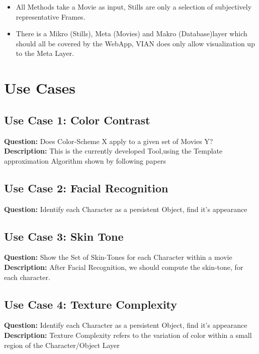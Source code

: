\documentclass[11pt, a4paper,oneside,chapterprefix=false]{scrbook}
\begin{document}
\begin{itemize}
	\item All Methods take a Movie as input, Stills are only a selection of subjectively representative Frames.
	\item There is a Mikro (Stills), Meta (Movies) and Makro (Database)layer which should all be covered by the WebApp, VIAN does only 
	allow visualization up to the Meta Layer.
	
\end{itemize}

\section{Use Cases} \label{chp:introduction}

\subsection{Use Case 1: Color Contrast}
\textbf{Question:} Does Color-Scheme X apply to a given set of Movies Y?\\
\textbf{Description:} This is the currently developed Tool,using the Template approximation Algorithm shown by following papers

\subsection{Use Case 2: Facial Recognition}
\textbf{Question:} Identify each Character as a persistent Object, find it's appearance\\ 


\subsection{Use Case 3: Skin Tone}
\textbf{Question:} Show the Set of Skin-Tones for each Character within a movie\\
\textbf{Description:} After Facial Recognition, we should compute the skin-tone, for each character.

\subsection{Use Case 4: Texture Complexity}
\textbf{Question:} Identify each Character as a persistent Object, find it's appearance\\
\textbf{Description:} Texture Complexity refers to the variation of color within a small region of the Character/Object Layer 
\end{document}
